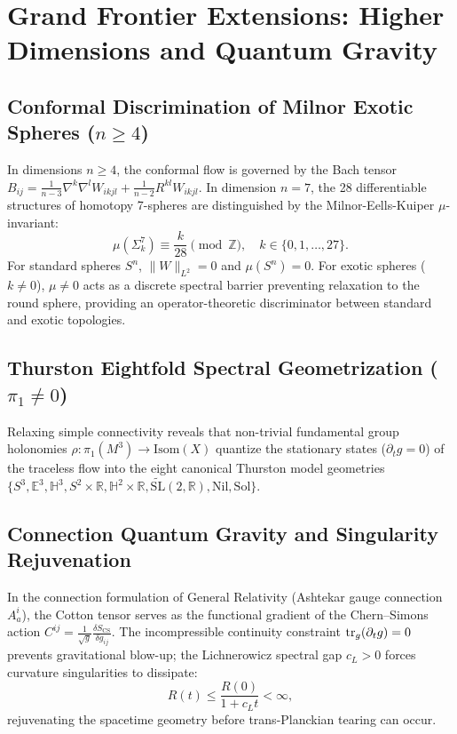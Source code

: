 \section{Grand Frontier Extensions: Higher Dimensions and Quantum Gravity}
\label{part-4:sec:frontier-extensions}

\subsection{\texorpdfstring{Conformal Discrimination of Milnor Exotic Spheres ($n \ge 4$)}{Conformal Discrimination of Milnor Exotic Spheres (n >= 4)}}
In dimensions $n \ge 4$, the conformal flow is governed by the Bach tensor $B_{ij} = \frac{1}{n-3} \nabla^k \nabla^l W_{ikjl} + \frac{1}{n-2} R^{kl} W_{ikjl}$. In dimension $n=7$, the 28 differentiable structures of homotopy 7-spheres are distinguished by the Milnor-Eells-Kuiper $\mu$-invariant:
\begin{equation}
    \mu(\Sigma^7_k) \equiv \frac{k}{28} \pmod \mathbb{Z}, \quad k \in \{0, 1, \dots, 27\}.
\end{equation}
For standard spheres $S^n$, $\|W\|_{L^2} = 0$ and $\mu(S^n) = 0$. For exotic spheres ($k \neq 0$), $\mu \neq 0$ acts as a discrete spectral barrier preventing relaxation to the round sphere, providing an operator-theoretic discriminator between standard and exotic topologies.

\subsection{\texorpdfstring{Thurston Eightfold Spectral Geometrization ($\pi_1 \neq 0$)}{Thurston Eightfold Spectral Geometrization (pi1 != 0)}}
Relaxing simple connectivity reveals that non-trivial fundamental group holonomies $\rho \colon \pi_1(M^3) \to \mathrm{Isom}(X)$ quantize the stationary states ($\partial_t g = 0$) of the traceless flow into the eight canonical Thurston model geometries $\{S^3, \mathbb{E}^3, \mathbb{H}^3, S^2 \times \mathbb{R}, \mathbb{H}^2 \times \mathbb{R}, \widetilde{\mathrm{SL}}(2,\mathbb{R}), \mathrm{Nil}, \mathrm{Sol}\}$.

\subsection{Connection Quantum Gravity and Singularity Rejuvenation}
In the connection formulation of General Relativity (Ashtekar gauge connection $A_a^i$), the Cotton tensor serves as the functional gradient of the Chern--Simons action $C^{ij} = \frac{1}{\sqrt{g}} \frac{\delta S_{\mathrm{CS}}}{\delta g_{ij}}$. The incompressible continuity constraint $\operatorname{tr}_g(\partial_t g) = 0$ prevents gravitational blow-up; the Lichnerowicz spectral gap $c_L > 0$ forces curvature singularities to dissipate:
\begin{equation}
    R(t) \le \frac{R(0)}{1 + c_L t} < \infty,
\end{equation}
rejuvenating the spacetime geometry before trans-Planckian tearing can occur.

